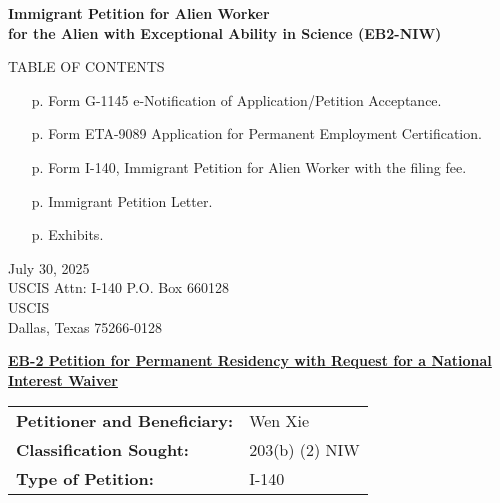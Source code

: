 \documentclass{article}
\begin{document}
\vspace*{\fill}
\begin{center}

{\bf 
Immigrant Petition for Alien Worker\\
for the Alien with Exceptional Ability in Science (EB2-NIW)
}

\end{center}
\vspace*{\fill}

\begin{center}
TABLE OF CONTENTS
\end{center}
\begin{itemize}
    \item [p. \pageref*{G-1145}] Form G-1145 e-Notification of Application/Petition Acceptance. 
    \item [p. \pageref*{ETA-9089}] Form ETA-9089 Application for Permanent Employment Certification. 
        
    \item [p. \pageref*{I-140}] Form I-140, Immigrant Petition for Alien Worker with the filing fee.
    \item [p. \pageref*{petition}] Immigrant Petition Letter.
    \item [p. \pageref*{exhib}] Exhibits.
\end{itemize}

\clearpage
\label{G-1145}


\label{ETA-9089}



\label{I-140}


\clearpage
July 30, 2025
\label{petition}
\\
USCIS  Attn: I‑140  P.O. Box 660128 \\
USCIS\\
Dallas, Texas 75266‑0128

\underline{\bf EB-2 Petition for Permanent Residency with Request for a National Interest Waiver}

\begin{tabular}{ll}
{\bf Petitioner and Beneficiary:} & Wen Xie \\
{\bf Classification Sought:} & 203(b) (2) NIW\\
{\bf Type of Petition:} & I-140
\end{tabular}
\vspace{2\baselineskip}
\end{document}
